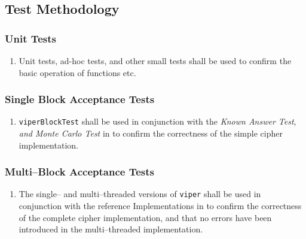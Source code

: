 \subsection{Test Methodology}

\subsubsection{Unit Tests}
\begin{enumerate}
\item Unit tests, ad-hoc tests, and other small tests shall be used to confirm the basic operation of functions etc.
\end{enumerate}


\subsubsection{Single Block Acceptance Tests}
\begin{enumerate}
\item \texttt{viperBlockTest} shall be used in conjunction with the \emph{Known Answer Test}, \emph{and Monte Carlo Test} in \cite{submission-files} to confirm the correctness of the simple cipher implementation.
\end{enumerate}

\subsubsection{Multi--Block Acceptance Tests}
\begin{enumerate}
\item The single-- and multi--threaded versions of \texttt{viper} shall be used in conjunction with the reference Implementations in \cite{submission-files, referenceImplementation} to confirm the correctness of the complete cipher implementation, and that no errors have been introduced in the multi--threaded implementation.
\end{enumerate}

